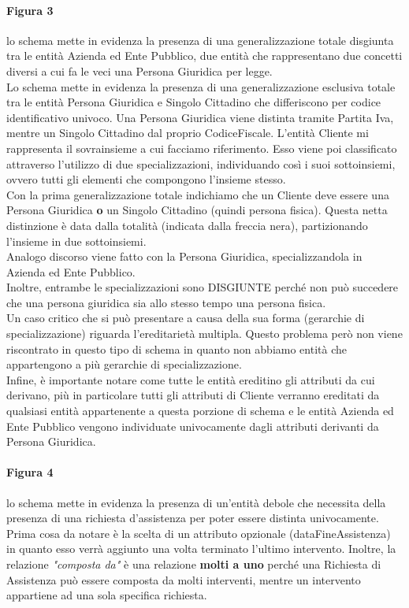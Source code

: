 \documentclass[legalpaper]{article}
\begin{document}
\paragraph{Figura 3}
lo schema mette in evidenza la presenza di una generalizzazione totale disgiunta tra le entità Azienda ed Ente Pubblico, due entità che rappresentano due concetti diversi a cui fa le veci una Persona Giuridica per legge.\\
Lo schema mette in evidenza la presenza di una generalizzazione esclusiva totale tra le entità Persona Giuridica e Singolo Cittadino che differiscono per codice identificativo univoco. Una Persona Giuridica viene distinta tramite Partita Iva, mentre un Singolo Cittadino dal proprio CodiceFiscale.
L'entità Cliente mi rappresenta il sovrainsieme a cui facciamo riferimento. Esso viene poi classificato attraverso l'utilizzo di due specializzazioni, individuando così i suoi sottoinsiemi, ovvero tutti gli elementi che compongono l'insieme stesso. \\
		Con la prima generalizzazione totale indichiamo che un Cliente deve essere una Persona Giuridica \textbf{o} un Singolo Cittadino (quindi persona fisica). Questa netta distinzione è data dalla totalità (indicata dalla freccia nera), partizionando l'insieme in due sottoinsiemi.\\
		Analogo discorso viene fatto con la Persona Giuridica, specializzandola in Azienda ed Ente Pubblico.\\
		Inoltre, entrambe le specializzazioni sono DISGIUNTE perché non può succedere che una persona giuridica sia allo stesso tempo una persona fisica.\\
		Un caso critico che si può presentare a causa della sua forma (gerarchie di specializzazione) riguarda l'ereditarietà multipla. Questo problema però non viene riscontrato in questo tipo di schema in quanto non abbiamo entità che appartengono a più gerarchie di specializzazione.\\
		Infine, è importante notare come tutte le entità ereditino gli attributi da cui derivano, più in particolare tutti gli attributi di Cliente verranno ereditati da qualsiasi entità appartenente a questa porzione di schema e le entità Azienda ed Ente Pubblico vengono individuate univocamente dagli attributi derivanti da Persona Giuridica.\\
\paragraph{Figura 4} 
lo schema mette in evidenza la presenza di un'entità debole che necessita della presenza di una richiesta d'assistenza per poter essere distinta univocamente.
Prima cosa da notare è la scelta di un attributo opzionale (dataFineAssistenza) in quanto esso verrà aggiunto una volta terminato l'ultimo intervento.
		Inoltre, la relazione \textit{"composta da"} è una relazione \textbf{molti a uno} perché una Richiesta di Assistenza può essere composta da molti interventi, mentre un intervento 
		appartiene ad una sola specifica richiesta.\\
\end{document}
